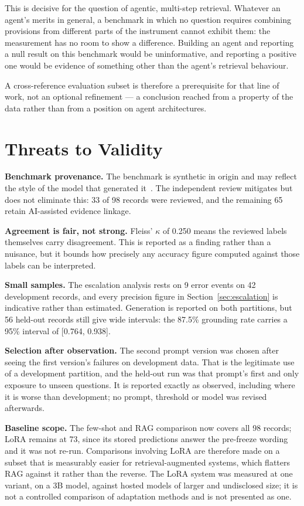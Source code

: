 This is decisive for the question of agentic, multi-step retrieval. Whatever an
agent's merits in general, a benchmark in which no question requires combining
provisions from different parts of the instrument cannot exhibit them: the
measurement has no room to show a difference. Building an agent and reporting a
null result on this benchmark would be uninformative, and reporting a positive one
would be evidence of something other than the agent's retrieval behaviour.

A cross-reference evaluation subset is therefore a prerequisite for that line of
work, not an optional refinement --- a conclusion reached from a property of the
data rather than from a position on agent architectures.

\section{Threats to Validity}
\label{sec:threats}

\textbf{Benchmark provenance.} The benchmark is synthetic in origin and may
reflect the style of the model that generated it~\cite{sainz2023contamination}.
The independent review mitigates but does not eliminate this: 33 of 98 records
were reviewed, and the remaining 65 retain AI-assisted evidence linkage.

\textbf{Agreement is fair, not strong.} Fleiss' $\kappa$ of 0.250 means the
reviewed labels themselves carry disagreement. This is reported as a finding
rather than a nuisance, but it bounds how precisely any accuracy figure computed
against those labels can be interpreted.

\textbf{Small samples.} The escalation analysis rests on 9 error events on 42
development records, and every precision figure in Section~\ref{sec:escalation} is
indicative rather than estimated. Generation is reported on both partitions, but
56 held-out records still give wide intervals: the 87.5\% grounding rate carries a
95\% interval of [0.764, 0.938].

\textbf{Selection after observation.} The second prompt version was chosen after
seeing the first version's failures on development data. That is the legitimate
use of a development partition, and the held-out run was that prompt's first and
only exposure to unseen questions. It is reported exactly as observed, including
where it is worse than development; no prompt, threshold or model was revised
afterwards.

\textbf{Baseline scope.} The few-shot and RAG comparison now covers all 98
records; LoRA remains at 73, since its stored predictions answer the pre-freeze
wording and it was not re-run. Comparisons involving LoRA are therefore made on a
subset that is measurably easier for retrieval-augmented systems, which flatters
RAG against it rather than the reverse. The LoRA system was measured at one variant, on a
3B model, against hosted models of larger and undisclosed size; it is not a
controlled comparison of adaptation methods and is not presented as one.

